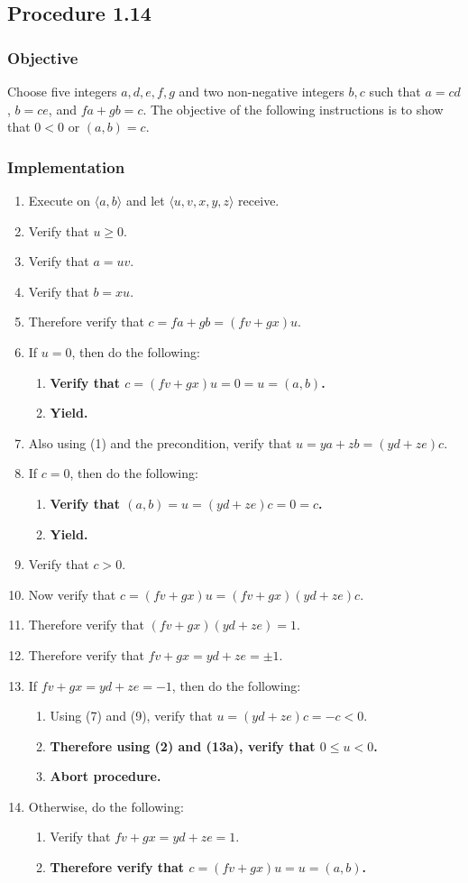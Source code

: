 \documentclass[twocolumn]{article}
\newcommand{\procedure}[2][]{\subsection*{Procedure #2 \ifthenelse{\equal{#1}{}}{}{(#1)}}\label{sec:procedure #2}}
\newcommand{\objective}{\subsubsection*{Objective}}
\newcommand{\implementation}{\subsubsection*{Implementation}}
\newcommand{\procedurehr}[2][]{\hyperref[sec:procedure #2]{\ifthenelse{\equal{#1}{}}{procedure #2}{#1}}}
\begin{document}
		\procedure{1.14}
			\objective
				Choose five integers $a,d,e,f,g$ and two non-negative integers $b,c$ such that $a=cd$, $b=ce$, and $fa+gb=c$. The objective of the following instructions is to show that $0<0$ or $(a,b)=c$.
			\implementation
				\begin{enumerate}
					\item Execute \procedurehr{1.09} on $\langle a,b\rangle$ and let $\langle u,v,x,y,z\rangle$ receive.
					\item Verify that $u\ge 0$.
					\item Verify that $a=uv$.
					\item Verify that $b=xu$.
					\item Therefore verify that $c=fa+gb=(fv+gx)u$.
					\item If $u=0$, then do the following:
					\begin{enumerate}
						\item \textbf{Verify that $c=(fv+gx)u=0=u=(a,b)$.}
						\item \textbf{Yield.}
					\end{enumerate}
					\item Also using (1) and the precondition, verify that $u=ya+zb=(yd+ze)c$.
					\item If $c=0$, then do the following:
					\begin{enumerate}
						\item \textbf{Verify that $(a,b)=u=(yd+ze)c=0=c$.}
						\item \textbf{Yield.}
					\end{enumerate}
					\item Verify that $c>0$.
					\item Now verify that $c=(fv+gx)u=(fv+gx)(yd+ze)c$.
					\item Therefore verify that $(fv+gx)(yd+ze)=1$.
					\item Therefore verify that $fv+gx=yd+ze=\pm 1$.
					\item If $fv+gx=yd+ze=-1$, then do the following:
					\begin{enumerate}
						\item Using (7) and (9), verify that $u=(yd+ze)c=-c<0$.
						\item \textbf{Therefore using (2) and (13a), verify that $0\le u<0$.}
						\item \textbf{Abort procedure.}
					\end{enumerate}
					\item Otherwise, do the following:
					\begin{enumerate}
						\item Verify that $fv+gx=yd+ze=1$.
						\item \textbf{Therefore verify that $c=(fv+gx)u=u=(a,b)$.}
					\end{enumerate}
				\end{enumerate}
\end{document}
